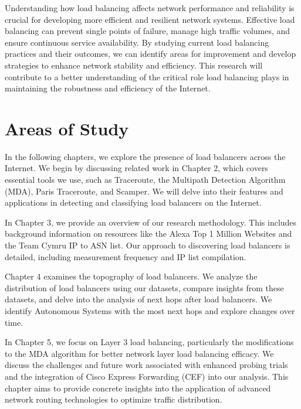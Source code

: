 \documentclass[12pt]{cwru_thesis}
\begin{document}
Understanding how load balancing affects network performance and reliability is crucial for developing more efficient and resilient network systems. Effective load balancing can prevent single points of failure, manage high traffic volumes, and ensure continuous service availability. By studying current load balancing practices and their outcomes, we can identify areas for improvement and develop strategies to enhance network stability and efficiency. This research will contribute to a better understanding of the critical role load balancing plays in maintaining the robustness and efficiency of the Internet.





\section{Areas of Study}

In the following chapters, we explore the presence of load balancers across the Internet. We begin by discussing related work in Chapter 2, which covers essential tools we use, such as Traceroute, the Multipath Detection Algorithm (MDA), Paris Traceroute, and Scamper. We will delve into their features and applications in detecting and classifying load balancers on the Internet.

In Chapter 3, we provide an overview of our research methodology. This includes background information on resources like the Alexa Top 1 Million Websites and the Team Cymru IP to ASN list. Our approach to discovering load balancers is detailed, including measurement frequency and IP list compilation.

Chapter 4 examines the topography of load balancers. We analyze the distribution of load balancers using our datasets, compare insights from these datasets, and delve into the analysis of next hops after load balancers. We identify Autonomous Systems with the most next hops and explore changes over time.

In Chapter 5, we focus on Layer 3 load balancing, particularly the modifications to the MDA algorithm for better network layer load balancing efficacy. We discuss the challenges and future work associated with enhanced probing trials and the integration of Cisco Express Forwarding (CEF) into our analysis. This chapter aims to provide concrete insights into the application of advanced network routing technologies to optimize traffic distribution.
\end{document}
